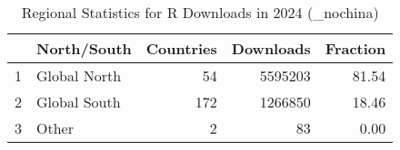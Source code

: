 \begin{table}[ht]
\centering
\begin{tabular}{rlrrr}
  \hline
 & North/South & Countries & Downloads & Fraction \\ 
  \hline
1 & Global North &  54 & 5595203 & 81.54 \\ 
  2 & Global South & 172 & 1266850 & 18.46 \\ 
  3 & Other &   2 &  83 & 0.00 \\ 
   \hline
\end{tabular}
\caption{Regional Statistics for R Downloads in 2024 (_nochina)} 
\label{tab:r_downloads_global_stats_2024_nochina}
\end{table}
